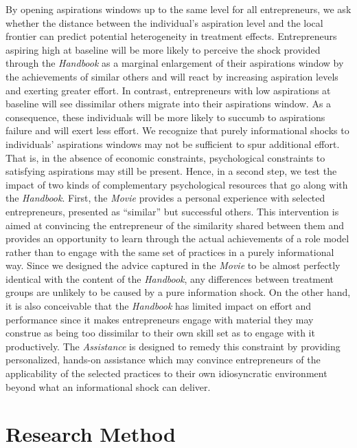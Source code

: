 \documentclass[11.5pt]{article}
\begin{document}
By opening aspirations windows up to the same level for all entrepreneurs, we ask whether the distance between the individual's aspiration level and the local frontier can predict potential heterogeneity in treatment effects. Entrepreneurs aspiring high at baseline will be more likely to perceive the shock provided through the \emph{Handbook} as a marginal enlargement of their aspirations window by the achievements of similar others and will react by increasing aspiration levels and exerting greater effort. In contrast, entrepreneurs with low aspirations at baseline will see dissimilar others migrate into their aspirations window. As a consequence, these individuals will be more likely to succumb to aspirations failure and will exert less effort. We recognize that purely informational shocks to individuals' aspirations windows may not be sufficient to spur additional effort. That is, in the absence of  economic constraints, psychological constraints to satisfying aspirations may still be present. Hence, in a second step, we test the impact of two kinds of complementary psychological resources that go along with the \emph{Handbook}. First, the \emph{Movie} provides a personal experience with selected entrepreneurs, presented as ``similar'' but successful others. This intervention is aimed at convincing the entrepreneur of the similarity shared between them and provides an opportunity to learn through the actual achievements of a role model rather than to engage with the same set of practices in a purely informational way. Since we designed the advice captured in the \emph{Movie} to be almost perfectly identical with the content of the \emph{Handbook}, any differences between treatment groups are unlikely to be caused by a pure information shock. On the other hand, it is also conceivable that the \emph{Handbook} has limited impact on effort and performance since it makes entrepreneurs engage with material they may construe as being too dissimilar to their own skill set as to engage with it productively. The \emph{Assistance} is designed to remedy this constraint by providing personalized, hands-on assistance which may convince entrepreneurs of the applicability of the selected practices to their own idiosyncratic environment beyond what an informational shock can deliver.



\section{\textbf{Research Method}}\label{sec.method}
\end{document}
